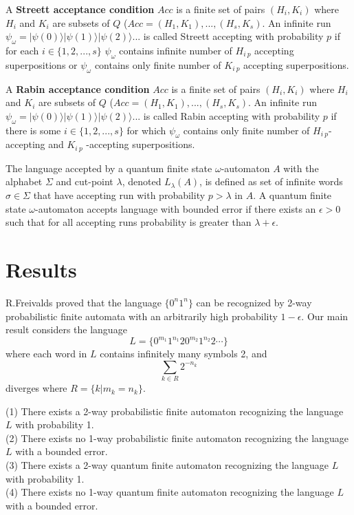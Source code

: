\documentclass{llncs}
\begin{document}
\begin{definition}
A \textbf{Streett acceptance condition} $Acc$ is a finite set of pairs $(H_i,K_i)$ where $H_i$ and $K_i$ are subsets of $Q$ ($Acc={(H_1,K_1),...,(H_s,K_s)}.$ An infinite run $\psi_\omega = |\psi(0)\rangle|\psi(1)\rangle|\psi(2)\rangle...$ is called Streett accepting with probability $p$ if for each $i \in \{1, 2, ..., s\}$ $\psi_\omega$ contains infinite number of $H_{i\ p}$ accepting superpositions or $\psi_\omega$ contains only finite number of $K_{i\ p}$ accepting superpositions.
\end{definition}

\begin{definition}
A \textbf{Rabin acceptance condition} $Acc$ is a finite set of pairs $(H_i,K_i)$ where $H_i$ and $K_i$ are subsets of $Q$ ($Acc={(H_1,K_1),...,(H_s,K_s)}.$ An infinite run $\psi_\omega = |\psi(0)\rangle|\psi(1)\rangle|\psi(2)\rangle...$ is called Rabin accepting with probability $p$ if there is some $i \in \{1, 2, ..., s\}$ for which $\psi_\omega$ contains only finite number of $H_{i\ p}$-accepting and $K_{i\ p}$ -accepting superpositions.
\end{definition}
%
The language accepted by a quantum finite state $\omega$-automaton $A$ with the alphabet $\Sigma$ and cut-point $\lambda$, denoted $L_\lambda(A)$, is defined as set of infinite words $\sigma \in \Sigma$ that have accepting run with probability $p > \lambda$ in $A$. A quantum finite state $\omega$-automaton accepts language with bounded error if there exists an $\epsilon >0$ such that for all accepting runs probability is greater than $\lambda + \epsilon$.






\section{Results}

R.Freivalds \cite{F81} proved that the language $\{0^n1^n\}$ can be recognized by 2-way probabilistic finite automata with an arbitrarily high probability
 $1 - \epsilon $. Our main result considers the language
$$
L = \{0^{m_1}1^{n_1}20^{m_2}1^{n_2}2\cdots \}
$$
where  each word in $L$ contains infinitely many symbols 2, and 
$$
\sum_{k \in R}{2^{-n_k}}
$$
diverges where $R = \{ k | m_k = n_k \}$.
  
 
 
 
\bigskip 
 
\begin{theorem}
(1) There exists a 2-way probabilistic finite automaton recognizing  the language $L$ with probability 1.\\
(2) There exists no 1-way probabilistic finite automaton recognizing  the language $L$ with a bounded error.\\
(3) There exists a 2-way quantum finite automaton recognizing  the language $L$ with probability 1.\\
(4) There exists no 1-way quantum finite automaton recognizing  the language $L$ with a bounded error.
\end{theorem}
\end{document}

